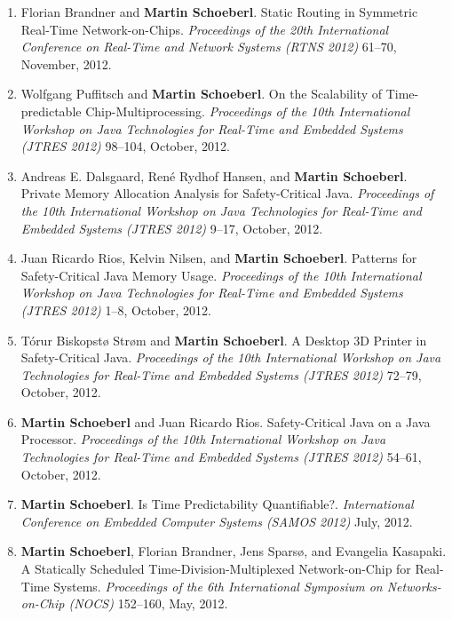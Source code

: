\begin{enumerate}
\item Florian Brandner and {\bf Martin Schoeberl}.
 Static Routing in Symmetric Real-Time Network-on-Chips.
 \emph{Proceedings of the 20th International Conference on Real-Time and Network Systems (RTNS 2012)} 61--70, November, 2012.

\item Wolfgang Puffitsch and {\bf Martin Schoeberl}.
 On the Scalability of Time-predictable Chip-Multiprocessing.
 \emph{Proceedings of the 10th International Workshop on Java Technologies for Real-Time and Embedded Systems (JTRES 2012)} 98--104, October, 2012.

\item Andreas E. Dalsgaard, Ren\'{e} Rydhof Hansen, and {\bf Martin Schoeberl}.
 Private Memory Allocation Analysis for Safety-Critical Java.
 \emph{Proceedings of the 10th International Workshop on Java Technologies for Real-Time and Embedded Systems (JTRES 2012)} 9--17, October, 2012.

\item Juan Ricardo Rios, Kelvin Nilsen, and {\bf Martin Schoeberl}.
 Patterns for Safety-Critical Java Memory Usage.
 \emph{Proceedings of the 10th International Workshop on Java Technologies for Real-Time and Embedded Systems (JTRES 2012)} 1--8, October, 2012.

\item T{\'o}rur Biskopst{\o} Str{\o}m and {\bf Martin Schoeberl}.
 A Desktop 3D Printer in Safety-Critical Java.
 \emph{Proceedings of the 10th International Workshop on Java Technologies for Real-Time and Embedded Systems (JTRES 2012)} 72--79, October, 2012.

\item {\bf Martin Schoeberl} and Juan Ricardo Rios.
 Safety-Critical Java on a Java Processor.
 \emph{Proceedings of the 10th International Workshop on Java Technologies for Real-Time and Embedded Systems (JTRES 2012)} 54--61, October, 2012.

\item {\bf Martin Schoeberl}.
 Is Time Predictability Quantifiable?.
 \emph{International Conference on Embedded Computer Systems (SAMOS 2012)} July, 2012.

\item {\bf Martin Schoeberl}, Florian Brandner, Jens Spars{\o}, and Evangelia Kasapaki.
 A Statically Scheduled Time-Division-Multiplexed Network-on-Chip for Real-Time Systems.
 \emph{Proceedings of the 6th International Symposium on Networks-on-Chip (NOCS)} 152--160, May, 2012.


\end{enumerate}
